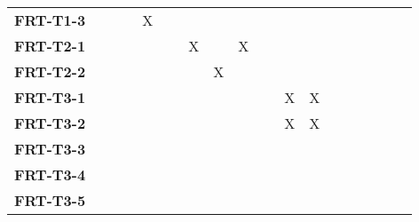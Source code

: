 \documentclass[12pt, titlepage]{article}
\begin{document}
\begin{landscape}
\begin{longtable}{|l|cccccccccccccccc|}
      	\textbf{FRT-T1-3}  & ~                                                         & ~            & X            & ~            & ~            & ~            & ~            & ~            & ~            & ~             \\
            \textbf{FRT-T2-1}  & ~                                                         & ~            & ~            & ~            & X            & ~            & X            & ~            & ~            & ~             \\
            \textbf{FRT-T2-2}  & ~                                                         & ~            & ~            & ~            & ~            & X            & ~            & ~            & ~            & ~             \\
            \textbf{FRT-T3-1}  & ~                                                         & ~            & ~            & ~            & ~            & ~            & ~            & ~            & X            & X             \\     
            \textbf{FRT-T3-2}  & ~                                                         & ~            & ~            & ~            & ~            & ~            & ~            & ~            & X            & X             \\     
            \textbf{FRT-T3-3}  & ~                                                         & ~            & ~            & ~            & ~            & ~            & ~            & ~            & ~            & ~             \\     
            \textbf{FRT-T3-4}  & ~                                                         & ~            & ~            & ~            & ~            & ~            & ~            & ~            & ~            & ~             \\     
            \textbf{FRT-T3-5}  & ~                                                         & ~            & ~            & ~            & ~            & ~            & ~            & ~            & ~            & ~             \\     
			\hline
			
		\end{longtable}
		

\end{landscape}
\end{document}
